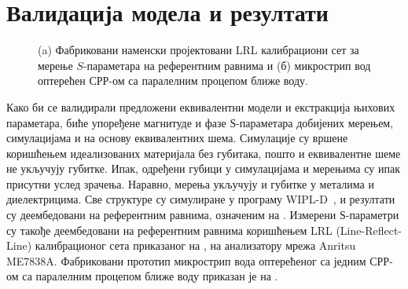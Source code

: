 \section{Валидација модела и резултати}

\begin{figure}[!t]
\centering
{}\hfill
{}
\caption{(a) Фабриковани наменски пројектовани LRL калибрациони сет за мерење $S$-параметара на референтним равнима и (б) микрострип вод оптерећен СРР-ом са паралелним процепом ближе воду.} 
\label{f9}
\end{figure}
Како би се валидирали предложени еквивалентни модели и екстракција њихових параметара, биће упоређене магнитуде и фазе $Ѕ$-параметара добијених мерењем, симулацијама и на основу еквивалентних шема. Симулације су вршене коришћењем идеализованих материјала без губитака, пошто и еквивалентне шеме не укључују губитке. Ипак, одређени губици у симулацијама и мерењима су ипак присутни услед зрачења. Наравно, мерења укључују и губитке у металима и диелектрицима. Све структуре су симулиране у програму WIPL-D~\cite{wipl}, и резултати су деембедовани на референтним равнима, означеним на . Измерени $Ѕ$-параметри су такође деембедовани на референтним равнима коришћењем LRL (Line-Reflect-Line) калибрационог сета приказаног на , на анализатору мрежа Anritsu ME7838A. Фабриковани прототип микрострип вода оптерећеног са једним СРР-ом са паралелним процепом ближе воду приказан је на .

